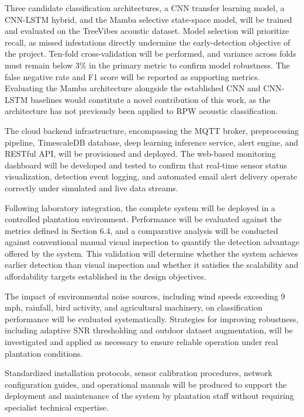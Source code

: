 \documentclass[12pt,a4paper,oneside]{memoir}
\begin{document}
Three candidate classification architectures, a CNN transfer learning model, a CNN-LSTM hybrid, and the Mamba selective state-space model, will be trained and evaluated on the TreeVibes acoustic dataset. Model selection will prioritize recall, as missed infestations directly undermine the early-detection objective of the project. Ten-fold cross-validation will be performed, and variance across folds must remain below 3\% in the primary metric to confirm model robustness. The false negative rate and F1 score will be reported as supporting metrics. Evaluating the Mamba architecture alongside the established CNN and CNN-LSTM baselines would constitute a novel contribution of this work, as the architecture has not previously been applied to RPW acoustic classification.

The cloud backend infrastructure, encompassing the MQTT broker, preprocessing pipeline, TimescaleDB database, deep learning inference service, alert engine, and RESTful API, will be provisioned and deployed. The web-based monitoring dashboard will be developed and tested to confirm that real-time sensor status visualization, detection event logging, and automated email alert delivery operate correctly under simulated and live data streams.

Following laboratory integration, the complete system will be deployed in a controlled plantation environment. Performance will be evaluated against the metrics defined in Section 6.4, and a comparative analysis will be conducted against conventional manual visual inspection to quantify the detection advantage offered by the system. This validation will determine whether the system achieves earlier detection than visual inspection and whether it satisfies the scalability and affordability targets established in the design objectives.

The impact of environmental noise sources, including wind speeds exceeding 9 mph, rainfall, bird activity, and agricultural machinery, on classification performance will be evaluated systematically. Strategies for improving robustness, including adaptive SNR thresholding and outdoor dataset augmentation, will be investigated and applied as necessary to ensure reliable operation under real plantation conditions.

Standardized installation protocols, sensor calibration procedures, network configuration guides, and operational manuals will be produced to support the deployment and maintenance of the system by plantation staff without requiring specialist technical expertise.

\printbibliography[title=References]
\end{document}
